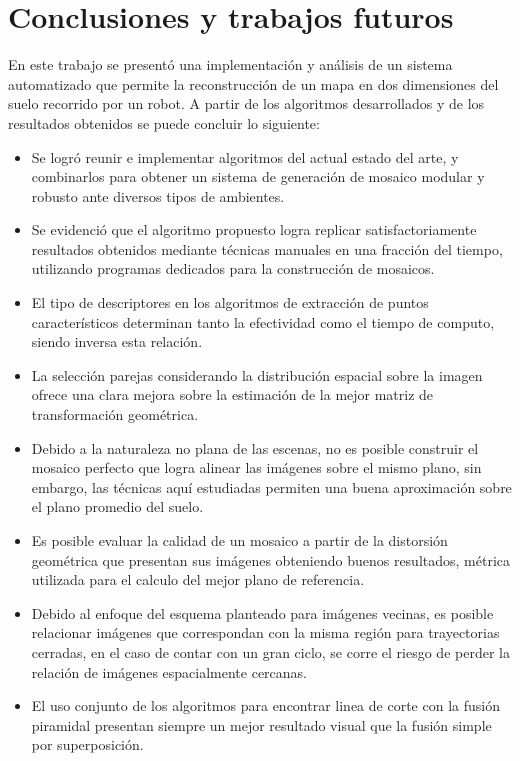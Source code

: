 \chapter{Conclusiones y trabajos futuros}
\label{capitulo6}

En este trabajo se presentó una implementación y análisis de un sistema automatizado que permite la reconstrucción de un mapa en dos dimensiones del suelo recorrido por un robot. A partir de los algoritmos desarrollados y de los resultados obtenidos se puede concluir lo siguiente:

\begin{itemize}
	\item Se logró reunir e implementar algoritmos del actual estado del arte, y combinarlos para obtener un sistema de generación de mosaico modular y robusto ante diversos tipos de ambientes.
	
	\item Se evidenció que el algoritmo propuesto logra replicar satisfactoriamente resultados obtenidos mediante técnicas manuales en una fracción del tiempo, utilizando programas dedicados para la construcción de mosaicos. 
	
	\item El tipo de descriptores en los algoritmos de extracción de puntos característicos determinan tanto la efectividad como el tiempo de computo, siendo inversa esta relación.
	
	\item La selección parejas considerando la distribución espacial sobre la imagen ofrece una clara mejora sobre la estimación de la mejor matriz de transformación geométrica.
	
	\item Debido a la naturaleza no plana de las escenas, no es posible construir el mosaico perfecto que logra alinear las imágenes sobre el mismo plano, sin embargo, las técnicas aquí estudiadas permiten una buena aproximación sobre el plano promedio del suelo.
	
	\item Es posible evaluar la calidad de un mosaico a partir de la distorsión geométrica que presentan sus imágenes obteniendo buenos resultados, métrica utilizada para el calculo del mejor plano de referencia.
	
	\item Debido al enfoque del esquema planteado para imágenes vecinas, es posible relacionar imágenes que correspondan con la misma región para trayectorias cerradas, en el caso de contar con un gran ciclo, se corre el riesgo de perder la relación de imágenes espacialmente cercanas.
	
	\item El uso conjunto de los algoritmos para encontrar linea de corte con la fusión piramidal presentan siempre un mejor resultado visual que la fusión simple por superposición.
		
\end{itemize}

